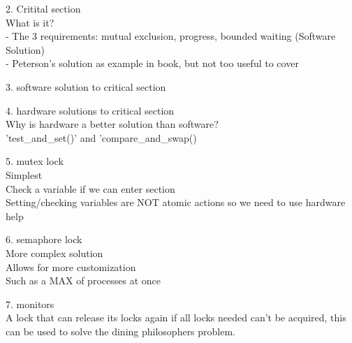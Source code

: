 \documentclass[a4paper,10pt,titlepage]{report}
\begin{document}
2. Critital section\\
\hspace{10mm}What is it?\\
\hspace{10mm}- The 3 requirements: mutual exclusion, progress, bounded waiting (Software
Solution) \\
\hspace{10mm}- Peterson's solution as example in book, but not too useful to cover \\
\vspace{5mm}



3. software solution to critical section\\
\vspace{5mm}



4. hardware solutions to critical section\\
\hspace{10mm} Why is hardware a better solution than software? \\
 	 	\hspace{10mm} 'test\_and\_set()' and 'compare\_and\_swap() \\
\vspace{5mm}


5. mutex lock\\
\hspace{10mm} Simplest \\
\hspace{10mm} Check a variable if we can enter section \\
\hspace{10mm} Setting/checking variables are NOT atomic actions so we need to use hardware help \\
\vspace{5mm}


6. semaphore lock\\
\hspace{10mm} More complex solution \\
\hspace{10mm} Allows for more customization \\
\hspace{10mm} Such as a MAX of processes at once \\
\vspace{5mm}


7. monitors\\
\hspace{10mm}  A lock that can release its locks again if all locks needed can't be acquired, this can be used to solve the dining philosophers problem. \\
\end{document}
